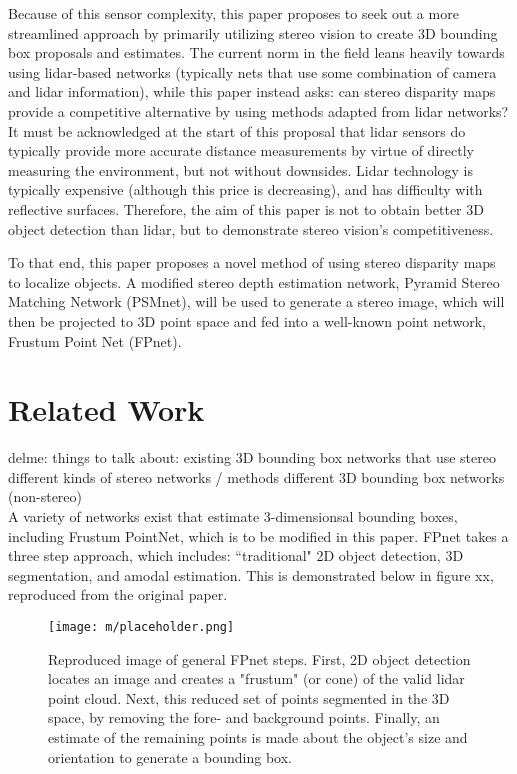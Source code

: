 
Because of this sensor complexity, this paper proposes to seek out a more streamlined approach by primarily utilizing stereo vision to create 3D bounding box proposals and estimates. The current norm in the field leans heavily towards using lidar-based networks (typically nets that use some combination of camera and lidar information), while this paper instead asks: can stereo disparity maps provide a competitive alternative by using methods adapted from lidar networks? It must be acknowledged at the start of this proposal that lidar sensors do typically provide more accurate distance measurements by virtue of directly measuring the environment, but not without downsides. Lidar technology is typically expensive (although this price is decreasing), and has difficulty with reflective surfaces. Therefore, the aim of this paper is not to obtain better 3D object detection than lidar, but to demonstrate stereo vision's competitiveness. 

To that end, this paper proposes a novel method of using stereo disparity maps to localize objects. A modified stereo depth estimation network, Pyramid Stereo Matching Network (PSMnet), will be used to generate a stereo image, which will then be projected to 3D point space and fed into a well-known point network, Frustum Point Net (FPnet).


\section{Related Work}
delme: things to talk about:
	existing 3D bounding box networks that use stereo
	different kinds of stereo networks / methods
	different 3D bounding box networks (non-stereo) \\
A variety of networks exist that estimate 3-dimensionsal bounding boxes, including Frustum PointNet, which is to be modified in this paper. FPnet takes a three step approach, which includes: ``traditional" 2D object detection, 3D segmentation, and amodal estimation. This is demonstrated below in figure xx, reproduced from the original paper.
\begin{figure}[h] %
    \texttt{[image: m/placeholder.png]}
    \caption{Reproduced image of general FPnet steps. First, 2D object detection locates an image and creates a "frustum" (or cone) of the valid lidar point cloud. Next, this reduced set of points segmented in the 3D space, by removing the fore- and background points. Finally, an estimate of the remaining points is made about the object's size and orientation to generate a bounding box.}
\end{figure}



